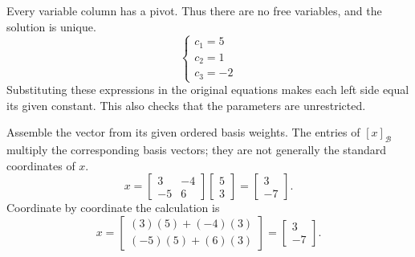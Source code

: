 Every variable column has a pivot. Thus there are no free variables, and the solution is unique.
\[ \begin{cases}c_{1}=5\\c_{2}=1\\c_{3}=-2\end{cases}\]
Substituting these expressions in the original equations makes each left side equal its given constant. This also checks that the parameters are unrestricted.

\goal Assemble the vector from its given ordered basis weights.
The entries of $[x]_{\mathcal B}$ multiply the corresponding basis vectors; they are not generally the standard coordinates of $x$.
\[x=\left[\begin{array}{rr}3&-4\\-5&6\end{array}\right]\left[\begin{array}{r}5\\3\end{array}\right]=\left[\begin{array}{r}3\\-7\end{array}\right].\]
Coordinate by coordinate the calculation is
\[x=\begin{bmatrix}(3)(5)+(-4)(3)\\(-5)(5)+(6)(3)\end{bmatrix}=\left[\begin{array}{r}3\\-7\end{array}\right].\]

